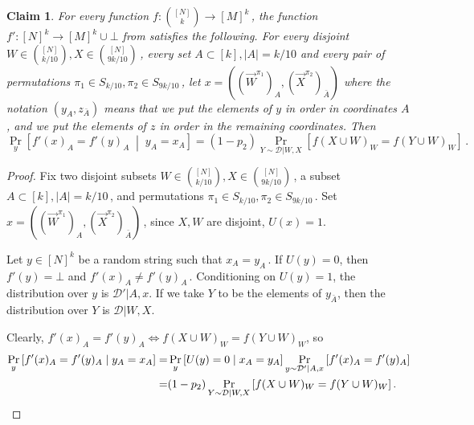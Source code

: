 \documentclass[11pt]{article}
\numberwithin{equation}{section}
\newtheorem{claim}[theorem]{Claim}
\theoremstyle{definition}
\theoremstyle{plain}
\newcommand{\Prob}[2][]{\Pr_{{#1}}\left[#2\right]} %
\newcommand{\abs}[1]{\lvert#1\rvert} %
\newcommand{\given}{\;\middle\vert\;} %
\newcommand\f{f} %
\newcommand\setf{f} %
\newcommand{\sets}{\binom{[N]}{k}} %
\newcommand\rest[1]{{\bar{#1}}}  %
\begin{document}
\begin{claim} \label{claim:set to tuple equality}
	For every function $\setf:\sets\rightarrow[M]^k$\,, the function $\f':[N]^k\rightarrow[M]^k\cup\bot$ from  satisfies the following.
	For every disjoint $W\in\binom{[N]}{k/10}, X\in\binom{[N]}{9k/10}$\,, every set $A\subset[k],\abs{A}=k/10$ and
%
every pair of permutations  %
$\pi_1\in S_{k/10},\pi_2\in S_{9k/10}$\,, let $x=((\vec W^{\pi_1})_A,(\vec X^{\pi_2})_{\rest A})$ where the notation $(y_A, z_{\rest A})$ means that we put the elements of $y$ in order in coordinates $A$, and we put the elements of $z$ in order in the remaining coordinates. Then  
	\[ \Prob[y]{\f'(x)_A = \f'(y)_A\given y_A=x_A} =(1-p_2)\Prob[Y\sim\mathcal{D}|{W,X}]{\setf(X\cup W)_W = \setf(Y\cup W)_W}\,. \]
\end{claim}
\begin{proof}

    Fix two disjoint subsets $W\in\binom{[N]}{k/10}, X\in\binom{[N]}{9k/10}$\,, a subset $A\subset[k],\abs{A}=k/10$\,, and permutations $\pi_1\in
	{S}_{k/10},\pi_2\in{S}_{9k/10}$\,. Set $x=((\vec W^{\pi_1})_A,(\vec X^{\pi_2})_{\rest A})$\,, since $X,W$ are disjoint, $U(x)=1$. 
	
	Let $y\in[N]^k$ be a random string such that $x_A=y_A$\,. If $U(y)=0$, then $\f'(y)=\bot$ and $\f'(x)_A \neq \f'(y)_A$\,. Conditioning on $U(y)=1$, the distribution over $y$ is $\mathcal{D}'|{A,x}$. If we take $Y$ to be the elements of $y_\rest{A}$, then the distribution over $Y$ is $\mathcal{D}|W,X$. 
	
	Clearly, $\f'(x)_A=\f'(y)_A\iff \setf(X \cup W)_W=\setf(Y \cup W)_W$, so 
	\begin{align*}
	\Prob[y]{\f'(x)_A = \f'(y)_A\given y_A=x_A} =& \Prob[y]{U(y)=0\given x_A=y_A}\Prob[y\sim\mathcal{D}'|{A,x}]{\f'(x)_A = \f'(y)_A} \\
	=&(1-p_2)\Prob[Y\sim\mathcal{D}|{W,X}]{\setf(X\cup W)_W = \setf(Y\cup W)_W}.
\qedhere \end{align*}   %
\end{proof}
\end{document}
